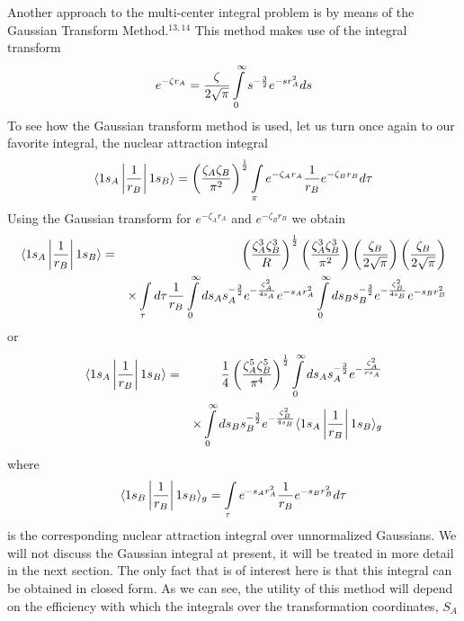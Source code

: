 Another approach to the multi-center integral problem is by means of
the Gaussian Transform Method.$^{13,14}$  This method makes use of the integral
transform
\begin{equation}
e^{-\zeta r_A} = {\zeta \over 2 \sqrt{\pi}} \int\limits^{\infty}_{0} 
s^{-{3 \over 2}} e^{-sr^2_A} ds
\end{equation}
To see how the Gaussian transform method is used, let us turn once again
to our favorite integral, the nuclear attraction integral
\begin{equation}
\langle 1s_A \left| {1 \over r_B} \right| 1s_B \rangle = 
\left( {\zeta_A \zeta_B \over \pi^2} \right)^{{1 \over 2}} 
\int\limits_{\pi} e^{-\zeta_Ar_A} {1 \over r_B} e^{-\zeta_B r_B} d \tau
\end{equation} 
Using the Gaussian transform for $e^{-\zeta_Ar_A}$ and $e^{-\zeta_B 
r_B}$ we obtain
\begin{eqnarray}
\langle 1s_A \left| {1 \over r_B} \right| 1s_B \rangle & = &
\left( {\zeta^3_A \zeta^3_B \over R} \right)^{{1 \over 2}} 
\left( {\zeta^3_A \zeta^3_B \over \pi^2} \right) 
\left( {\zeta_B \over 2 \sqrt{\pi}} \right)
\left( {\zeta_B \over 2 \sqrt{\pi}} \right)\cr
&& \times \int\limits_{\tau} d \tau {1 \over r_B} \int\limits^{\infty}_{0} 
ds_A s_A^{-{3 \over 2}} e^{-{\zeta^2_A \over 4s_A}} e^{-s_Ar^2_A}
\int\limits^{\infty}_{0} ds_Bs_B^{-{3 \over 2}} e^{-{\zeta^2_B \over 
4s_B}} e^{-s_Br_B^2}
\end{eqnarray}
or
\begin{eqnarray}
\langle 1s_A \left| {1 \over r_B} \right| 1s_B \rangle & = & {1 \over 4} 
\left( {\zeta^5_A \zeta^5_B \over \pi^4} \right)^{{1 \over 2}} 
\int\limits^{\infty}_{0} ds_As_A^{-{3 \over 2}} e^{-{\zeta^2_A \over 
rs_A}}\cr 
&& \times \int\limits^{\infty}_{0} ds_B s_B^{-{3 \over 2}} 
e^{-{\zeta^2_B \over 4s_B}} \langle 1s_A \left| {1 \over r_B} \right| 
1s_B \rangle_g
\end{eqnarray}
where
\begin{equation}
\langle 1s_B \left| {1 \over r_B} \right| 1s_B \rangle_g = 
\int\limits_{\tau} e^{-s_Ar_A^2} {1 \over r_B} e^{-s_Br_B^2} d \tau
\end{equation}
is the corresponding nuclear attraction integral over unnormalized 
Gaussians. We will not discuss the Gaussian integral at present, it will be 
treated in more detail in the next section. The only fact that is of 
interest here is that this integral can be obtained in closed form. As 
we can see, the utility of this method will depend on the efficiency 
with which the integrals over the transformation coordinates, $S_A$ 
